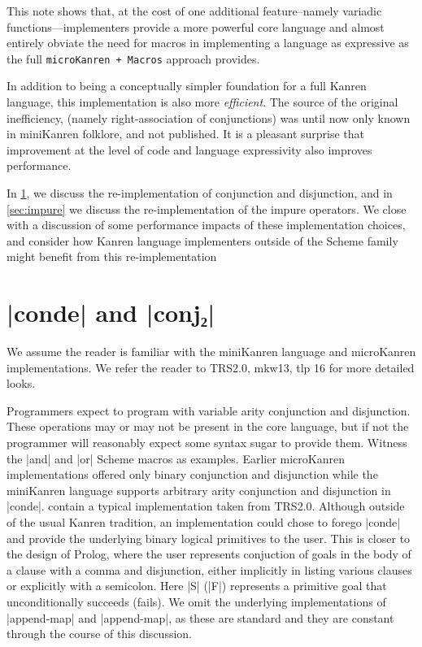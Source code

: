 \documentclass[sigplan,screen,draft,anonymous,review,natbib=false]{acmart}
\begin{document}
This note shows that, at the cost of one additional feature--namely
variadic functions---implementers provide a more powerful core
language and almost entirely obviate the need for macros in
implementing a language as expressive as the full
\verb|microKanren + Macros| approach provides.

In addition to being a conceptually simpler foundation for a full
Kanren language, this implementation is also more \emph{efficient}.
The source of the original inefficiency, (namely right-association of
conjunctions) was until now only known in miniKanren folklore, and not
published. It is a pleasant surprise that improvement at the level of
code and language expressivity also improves performance.

In \cref{sec:conde}, we discuss the re-implementation of conjunction
and disjunction, and in \cref{sec:impure} we discuss the
re-implementation of the impure operators. We close with a discussion
of some performance impacts of these implementation choices, and
consider how Kanren language implementers outside of the Scheme family
might benefit from this re-implementation

\section{\rackinline|conde| and \rackinline|conj₂|}\label{sec:conde}

We assume the reader is familiar with the miniKanren language and
microKanren implementations. We refer the reader to TRS2.0, mkw13, tlp
16 for more detailed looks.

Programmers expect to program with variable arity conjunction and
disjunction. These operations may or may not be present in the core
language, but if not the programmer will reasonably expect some syntax
sugar to provide them. Witness the \rackinline|and| and
\rackinline|or| Scheme macros as examples. Earlier microKanren
implementations offered only binary conjunction and disjunction while
the miniKanren language supports arbitrary arity conjunction and
disjunction in \rackinline|conde|.
contain a typical implementation taken from TRS2.0. Although outside
of the usual Kanren tradition, an implementation could chose to forego
\rackinline|conde| and provide the underlying binary logical
primitives to the user. This is closer to the design of Prolog, where
the user represents conjuction of goals in the body of a clause with a
comma and disjunction, either implicitly in listing various clauses or
explicitly with a semicolon. Here \rackinline|S| (\rackinline|F|)
represents a primitive goal that unconditionally succeeds (fails). We
omit the underlying implementations of \rackinline|append-map| and
\rackinline|append-map|, as these are standard and they are constant
through the course of this discussion.
\end{document}

